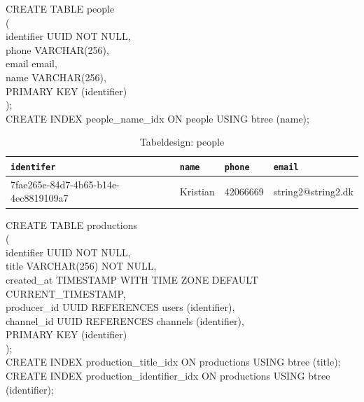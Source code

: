 \noindent
CREATE TABLE people\\
(\\
    identifier UUID NOT NULL,\\
    phone       VARCHAR(256),\\
    email      email,\\
    name       VARCHAR(256),\\
    PRIMARY KEY (identifier)\\
);\\
CREATE INDEX people\_name\_idx ON people USING btree (name);\\


\begin{table}[ht]
    \begin{tabularx}{\textwidth}{|X|X|X|X|}
        \hline
        \texttt{\textbf{identifer}} &  \texttt{\textbf{name}} & \texttt{\textbf{phone}} & \texttt{\textbf{email}}\\
        \hline
        7fae265e-84d7-4b65-b14e-4ec8819109a7 & Kristian & 42066669 & string2@string2.dk\\
        \hline
    \end{tabularx}
    \caption{Tabeldesign: people}
    \label{tab:people_table}
\end{table}



\noindent
CREATE TABLE productions\\
(\\
    identifier  UUID         NOT NULL,\\
    title       VARCHAR(256) NOT NULL,\\
    created\_at  TIMESTAMP WITH TIME ZONE DEFAULT CURRENT\_TIMESTAMP,\\
    producer\_id UUID REFERENCES users (identifier),\\
    channel\_id  UUID REFERENCES channels (identifier),\\
    PRIMARY KEY (identifier)\\
);\\
CREATE INDEX production\_title\_idx ON productions USING btree (title);\\
CREATE INDEX production\_identifier\_idx ON productions USING btree (identifier);\\


